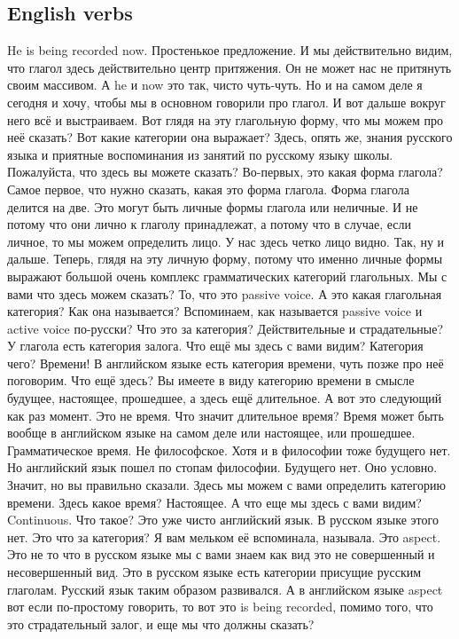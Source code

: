 \documentclass[main.tex]{subfiles}
\begin{document}
\subsection{English verbs}

He is being recorded now.
Простенькое предложение.
И мы действительно видим, что глагол здесь действительно центр притяжения.
Он не может нас не притянуть своим массивом.
А he и now это так, чисто чуть-чуть.
Но и на самом деле я сегодня и хочу, чтобы мы в основном говорили про глагол.
И вот дальше вокруг него всё и выстраиваем.
Вот глядя на эту глагольную форму, что мы можем про неё сказать?
Вот какие категории она выражает?
Здесь, опять же, знания русского языка и приятные воспоминания из занятий по русскому языку школы.
Пожалуйста, что здесь вы можете сказать?
Во-первых, это какая форма глагола?
Самое первое, что нужно сказать, какая это форма глагола.
Форма глагола делится на две.
Это могут быть личные формы глагола или неличные.
И не потому что они лично к глаголу принадлежат, а потому что в случае, если личное, то мы можем определить лицо.
У нас здесь четко лицо видно.
Так, ну и дальше.
Теперь, глядя на эту личную форму, потому что именно личные формы выражают большой очень комплекс грамматических категорий глагольных.
Мы с вами что здесь можем сказать?
То, что это passive voice.
А это какая глагольная категория?
Как она называется?
Вспоминаем, как называется passive voice и active voice по-русски?
Что это за категория?
Действительные и страдательные?
У глагола есть категория залога.
Что ещё мы здесь с вами видим?
Категория чего?
Времени!
В английском языке есть категория времени, чуть позже про неё поговорим.
Что ещё здесь?
Вы имеете в виду категорию времени в смысле будущее, настоящее, прошедшее, а здесь ещё длительное.
А вот это следующий как раз момент.
Это не время.
Что значит длительное время?
Время может быть вообще в английском языке на самом деле или настоящее, или прошедшее.
Грамматическое время.
Не философское.
Хотя и в философии тоже будущего нет.
Но английский язык пошел по стопам философии.
Будущего нет.
Оно условно.
Значит, но вы правильно сказали.
Здесь мы можем с вами определить категорию времени.
Здесь какое время?
Настоящее.
А что еще мы здесь с вами видим? Continuous.
Что такое?
Это уже чисто английский язык.
В русском языке этого нет.
Это что за категория?
Я вам мельком её вспоминала, называла.
Это aspect.
Это не то что в русском языке мы с вами знаем как вид это не совершенный и несовершенный вид.
Это в русском языке есть категории присущие русским глаголам.
Русский язык таким образом развивался.
А в английском языке aspect вот если по-простому говорить, то вот это is being recorded, помимо того, что это страдательный залог, и еще мы что должны сказать?
\end{document}
